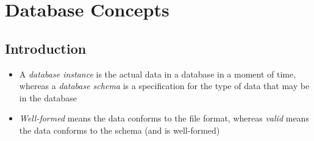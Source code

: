 \documentclass[a4paper]{article}
\begin{document}
\section{Database Concepts}
\subsection{Introduction}
\begin{itemize}
    \item A \emph{database instance} is the actual data in a database in a moment of time, whereas a \emph{database schema} is a specification for the type of data that may be in the database
    \item \emph{Well-formed} means the data conforms to the file format, whereas \emph{valid} means the data conforms to the schema (and is well-formed)
\end{itemize}
\end{document}
